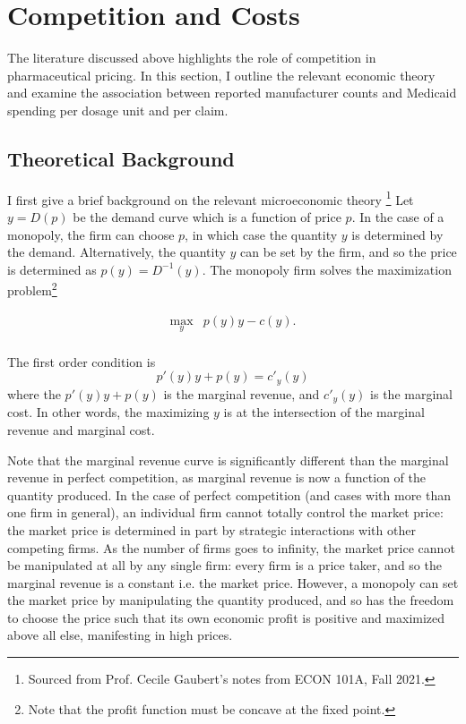 \documentclass[12pt]{article}
\begin{document}
\section{Competition and Costs}
The literature discussed above highlights the role of competition in pharmaceutical pricing. In this section, I outline the relevant economic theory and examine the association between reported manufacturer counts and Medicaid spending per dosage unit and per claim.
\subsection{Theoretical Background}
I first give a brief background on the relevant microeconomic theory \footnote{Sourced from Prof. Cecile Gaubert's notes from ECON 101A, Fall 2021.} Let $y = D(p)$ be the demand curve which is a function of price $p$. In the case of a monopoly, the firm can choose $p$, in which case the quantity $y$ is determined by the demand. Alternatively, the quantity $y$ can be set by the firm, and so the price is determined as $p(y) = D^{-1}(y)$. The monopoly firm solves the maximization problem\footnote{Note that the profit function must be concave at the fixed point.}

\begin{equation}
\begin{array}{rrclcl}
\displaystyle \max_{y} & p(y)y - c(y).\\
\end{array}
\end{equation}

The first order condition is $$ p'(y)y + p(y) = c'_y(y)$$ where the $p'(y)y + p(y)$ is the marginal revenue, and $c'_y(y)$ is the marginal cost. In other words, the maximizing $y$ is at the intersection of the marginal revenue and marginal cost. 

Note that the marginal revenue curve is significantly different than the marginal revenue in perfect competition, as marginal revenue is now a function of the quantity produced. In the case of perfect competition (and cases with more than one firm in general), an individual firm cannot totally control the market price: the market price is determined in part by strategic interactions with other competing firms. As the number of firms goes to infinity, the market price cannot be manipulated at all by any single firm: every firm is a price taker, and so the marginal revenue is a constant i.e. the market price. However, a monopoly can set the market price by manipulating the quantity produced, and so has the freedom to choose the price such that its own economic profit is positive and maximized above all else, manifesting in high prices.
\end{document}
